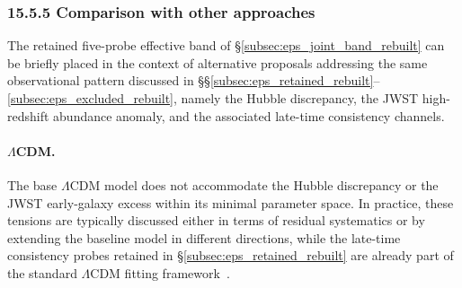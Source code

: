 %
%
%
%

\subsubsection*{\normalfont\textbf{15.5.5 \quad Comparison with other approaches}}
\label{subsec:eps_comparison_rebuilt}

The retained five-probe effective band of
\S\ref{subsec:eps_joint_band_rebuilt} can be briefly placed in the
context of alternative proposals addressing the same observational
pattern discussed in
\S\S\ref{subsec:eps_retained_rebuilt}--\ref{subsec:eps_excluded_rebuilt},
namely the Hubble discrepancy, the JWST high-redshift abundance
anomaly, and the associated late-time consistency channels.

\paragraph{$\Lambda$CDM.}
The base $\Lambda$CDM model does not accommodate the Hubble
discrepancy or the JWST early-galaxy excess within its minimal
parameter space. In practice, these tensions are typically discussed
either in terms of residual systematics or by extending the baseline
model in different directions, while the late-time consistency probes
retained in \S\ref{subsec:eps_retained_rebuilt} are already part of
the standard $\Lambda$CDM fitting framework~\cite{Planck2018}.

